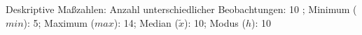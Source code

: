 				\label{tableValues:bsch04b_v1}
				\vspace*{-\baselineskip}
                    \begin{noten}
                	    \note{} Deskriptive Maßzahlen:
                	    Anzahl unterschiedlicher Beobachtungen: 10%
                	    ; 
                	      Minimum ($min$): 5; 
                	      Maximum ($max$): 14; 
                	      Median ($\tilde{x}$): 10; 
                	      Modus ($h$): 10
                     \end{noten}


